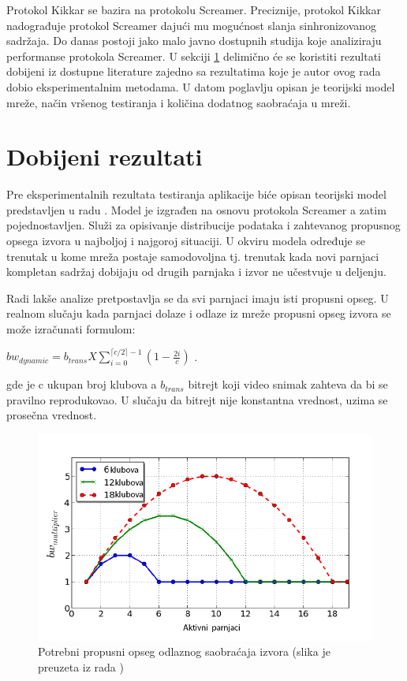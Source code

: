 \documentclass[12pt,oneside]{memoir}
\begin{document}
Protokol Kikkar se bazira na protokolu Screamer. Preciznije, protokol Kikkar nadograđuje protokol Screamer dajući mu mogućnost slanja sinhronizovanog sadržaja. Do danas postoji jako malo javno dostupnih studija koje analiziraju performanse protokola Screamer. U sekciji \ref{testiranja.1} delimično će se koristiti rezultati dobijeni iz dostupne literature zajedno sa rezultatima koje je autor ovog rada dobio eksperimentalnim metodama. U datom poglavlju opisan je teorijski model mreže, način vršenog testiranja i količina dodatnog saobraćaja u mreži.

\section{Dobijeni rezultati}
\label{testiranja.1}
Pre eksperimentalnih rezultata testiranja aplikacije biće opisan teorijski model predstavljen u radu \cite{ClubbingWithThePeers}. Model je izgrađen na osnovu protokola Screamer a zatim pojednostavljen. Služi za opisivanje distribucije podataka i zahtevanog propusnog opsega izvora u najboljoj i najgoroj situaciji. U okviru modela određuje se trenutak u kome mreža postaje samodovoljna tj. trenutak kada novi parnjaci kompletan sadržaj dobijaju od drugih parnjaka i izvor ne učestvuje u deljenju. 

Radi lakše analize pretpostavlja se da svi parnjaci imaju isti propusni opseg. U realnom slučaju kada parnjaci dolaze i odlaze iz mreže propusni opseg izvora se može izračunati formulom:

$ bw_{dynamic} = b_{trans} X \sum_{i=0}^{ \lceil c/2 \rceil - 1} ( 1 - \frac{2i}{c}) $ .

gde je c ukupan broj klubova a $b_{trans}$ bitrejt koji video snimak zahteva da bi se pravilno reprodukovao. U slučaju da bitrejt nije konstantna vrednost, uzima se prosečna vrednost. 

\begin{figure}[!ht]
  \centering
  \includegraphics[width=1\textwidth]{slike/teorijski-model.jpg}
  \caption{Potrebni  propusni opseg odlaznog saobraćaja izvora (slika je preuzeta iz rada \cite{ClubbingWithThePeers})}
  \label{fig:teorijski-model}
\end{figure}
\par
\end{document}
